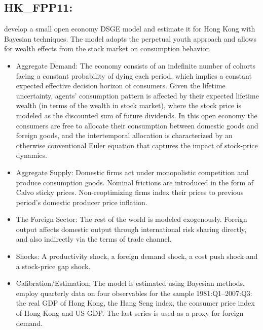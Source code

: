 \documentclass[11pt,a4paper]{article}
\begin{document}
	
	\subsection{HK\_FPP11: \cite{FunkePaetzPytlarczyk2011}}
	\label{HKFPP11}
	\cite{FunkePaetzPytlarczyk2011} develop a small open economy DSGE model and estimate it for Hong Kong with Bayesian techniques. The model adopts the perpetual youth approach and allows for wealth effects from the stock market on consumption
	behavior.
	
	\begin{itemize}
		
		\item Aggregate Demand:  The economy consists of an indefinite number of cohorts facing a constant probability of dying each period, which implies a constant expected effective decision horizon of consumers. Given the lifetime uncertainty, agents' consumption pattern is affected by their expected lifetime wealth (in terms of the wealth in stock market), where the stock price is modeled as the discounted sum of future dividends. In this open economy the consumers are free to allocate their consumption between domestic goods and foreign goods, and the intertemporal allocation is characterized by an otherwise conventional Euler equation that captures the impact of stock-price dynamics.
		
		\item Aggregate Supply: Domestic firms act under monopolistic competition and produce consumption goods. Nominal frictions are introduced in the form of Calvo sticky prices. Non-reoptimizing firms index their prices to previous period's domestic producer price inflation.
		
		\item The Foreign Sector: The rest of the world is modeled exogenously. Foreign output affects domestic output through international risk sharing directly, and also indirectly via the terms of trade channel.
		
		\item Shocks: A productivity shock, a foreign demand shock, a cost push shock and a stock-price gap shock.
		
		\item Calibration/Estimation: The model is estimated using Bayesian methods. \cite{FunkePaetzPytlarczyk2011} employ quarterly data on four observables for the sample 1981:Q1--2007:Q3: the real GDP of Hong Kong, the Hang Seng index, the consumer price index of Hong Kong and US GDP. The last series is used as a proxy for foreign demand.
		
		
	\end{itemize}
	
\end{document}
